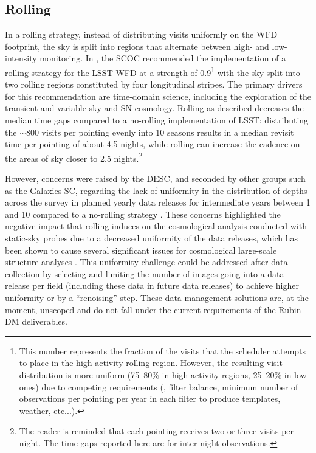 \subsection{Rolling}\label{sec:rolling}
In a rolling strategy, instead of distributing visits uniformly on the WFD footprint, the sky is split into regions that alternate between high- and low-intensity monitoring. In , the SCOC recommended the implementation of a rolling strategy for the LSST WFD at a strength of 0.9\footnote{This number represents the fraction of the visits that the scheduler attempts to place in the high-activity rolling region. However, the resulting visit distribution is more uniform (75--80\% in high-activity regions, 25--20\% in low ones) due to competing requirements (\eg , filter balance, minimum number of observations per pointing per year in each filter to produce templates, weather, etc...).} 
with the sky split into two rolling regions constituted by four longitudinal stripes. The primary drivers for this recommendation are time-domain science, including the exploration of the transient and variable sky and SN cosmology. Rolling as described decreases the median time gaps compared to a no-rolling implementation of LSST:
distributing the \mbox{$\sim$800} visits per pointing evenly into 10 seasons results in a median revisit time per pointing of about 4.5 nights, while rolling can increase the cadence on the areas of sky closer to 2.5 nights.\footnote{The reader is reminded that each pointing receives two or three visits per night. The time gaps reported here are for inter-night observations.}

 However, concerns were raised by the DESC, and seconded by other groups such as the Galaxies SC, regarding the lack of uniformity in the distribution of depths across the survey in planned yearly data releases for intermediate years between 1 and 10 compared to a no-rolling strategy \citep[see discussion in][which noted this as a potential future concern before the adoption of a rolling cadence as the baseline]{2022ApJS..259...58L}.  These concerns highlighted the negative impact that rolling induces on the cosmological analysis conducted with static-sky probes due to a decreased uniformity of the data releases, which has been shown to cause several significant issues for cosmological large-scale structure analyses \citep[\eg ,][]{2022PhRvD.105b3520A,2023JCAP...07..044B}.  
 This uniformity challenge could be addressed after data collection by selecting and limiting the number of images going into a data release per field (including these data in future data releases) to achieve higher uniformity or by a ``renoising'' step. These data management solutions are, at the moment, unscoped and do not fall under the current requirements of the Rubin DM deliverables.

